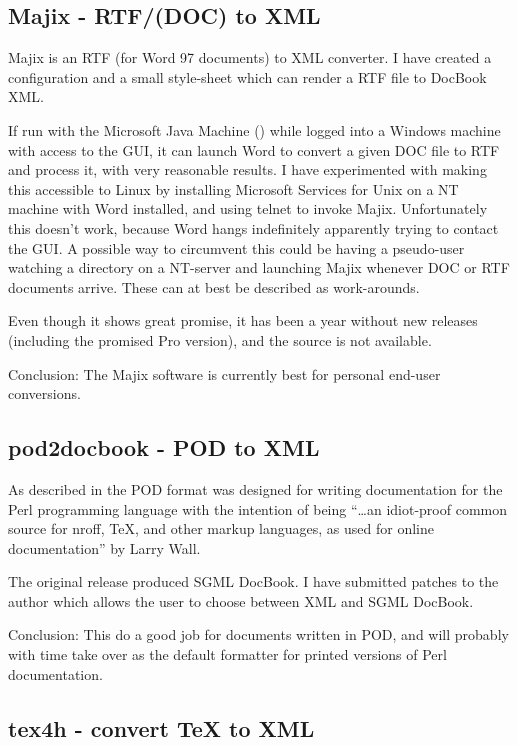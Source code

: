 \subsection{Majix - RTF/(DOC) to XML}

Majix is an RTF (for Word 97
documents) to XML converter.  I have created a configuration and a
small style-sheet which can render a RTF file to DocBook XML.

If run with the Microsoft Java Machine () while
logged into a Windows machine with access to the GUI, it can launch
Word to convert a given DOC file to RTF and process it, with very
reasonable results.  I have experimented with making this accessible
to Linux by installing Microsoft Services for Unix on a NT machine
with Word installed, and using telnet to invoke Majix.  Unfortunately
this doesn't work, because Word hangs indefinitely apparently trying
to contact the GUI.  A possible way to circumvent this could be having
a pseudo-user watching a directory on a NT-server and launching Majix
whenever DOC or RTF documents arrive.  These can at best be described
as work-arounds.

Even though it shows great promise, it has been a year without new
releases (including the promised Pro version), and the source is not
available.  

Conclusion: The Majix software is currently best for personal end-user
conversions.


\subsection{pod2docbook - POD to XML}

As described in  the POD format was designed for
writing documentation for the Perl programming language with the
intention of being ``\ldots an idiot-proof common source for nroff, TeX,
and other markup languages, as used for online documentation'' by
Larry Wall.
       
The original release produced SGML DocBook.  I have submitted patches
to the author which allows the user to choose between XML and SGML
DocBook.

Conclusion:  This do a good job for documents written in POD, and will
probably with time take over as the default formatter for printed
versions of Perl documentation.

\subsection{tex4h - convert {\TeX} to XML}

